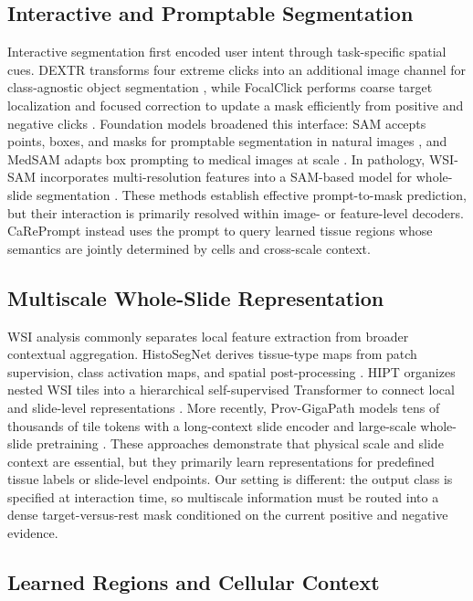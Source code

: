 \documentclass[letterpaper]{article} %
\begin{document}
\subsection{Interactive and Promptable Segmentation}

Interactive segmentation first encoded user intent through task-specific spatial cues. DEXTR transforms four extreme clicks into an additional image channel for class-agnostic object segmentation \cite{maninis2018dextr}, while FocalClick performs coarse target localization and focused correction to update a mask efficiently from positive and negative clicks \cite{chen2022focalclick}. Foundation models broadened this interface: SAM accepts points, boxes, and masks for promptable segmentation in natural images \cite{kirillov2023segment}, and MedSAM adapts box prompting to medical images at scale \cite{ma2024medsam}. In pathology, WSI-SAM incorporates multi-resolution features into a SAM-based model for whole-slide segmentation \cite{liu2024wsisam}. These methods establish effective prompt-to-mask prediction, but their interaction is primarily resolved within image- or feature-level decoders. CaRePrompt instead uses the prompt to query learned tissue regions whose semantics are jointly determined by cells and cross-scale context.

\subsection{Multiscale Whole-Slide Representation}

WSI analysis commonly separates local feature extraction from broader contextual aggregation. HistoSegNet derives tissue-type maps from patch supervision, class activation maps, and spatial post-processing \cite{chan2019histosegnet}. HIPT organizes nested WSI tiles into a hierarchical self-supervised Transformer to connect local and slide-level representations \cite{chen2022hipt}. More recently, Prov-GigaPath models tens of thousands of tile tokens with a long-context slide encoder and large-scale whole-slide pretraining \cite{xu2024gigapath}. These approaches demonstrate that physical scale and slide context are essential, but they primarily learn representations for predefined tissue labels or slide-level endpoints. Our setting is different: the output class is specified at interaction time, so multiscale information must be routed into a dense target-versus-rest mask conditioned on the current positive and negative evidence.

\subsection{Learned Regions and Cellular Context}
\end{document}
